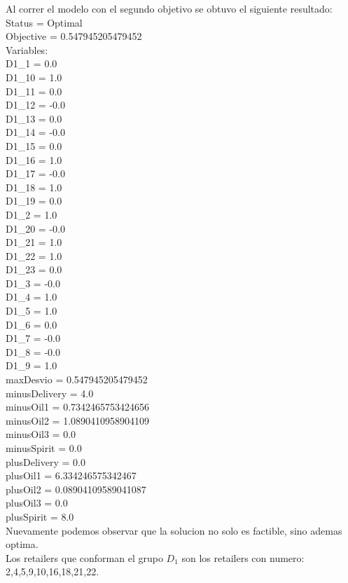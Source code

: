 Al correr el modelo con el segundo objetivo se obtuvo el siguiente resultado: \\

Status = Optimal \\
Objective = 0.547945205479452 \\
Variables: \\
D1\_1 = 0.0 \\
D1\_10 = 1.0 \\
D1\_11 = 0.0 \\
D1\_12 = -0.0 \\
D1\_13 = 0.0 \\
D1\_14 = -0.0 \\
D1\_15 = 0.0 \\
D1\_16 = 1.0 \\
D1\_17 = -0.0 \\
D1\_18 = 1.0 \\
D1\_19 = 0.0 \\
D1\_2 = 1.0 \\
D1\_20 = -0.0 \\
D1\_21 = 1.0 \\
D1\_22 = 1.0 \\
D1\_23 = 0.0 \\
D1\_3 = -0.0 \\
D1\_4 = 1.0 \\
D1\_5 = 1.0 \\
D1\_6 = 0.0 \\
D1\_7 = -0.0 \\
D1\_8 = -0.0 \\
D1\_9 = 1.0 \\
maxDesvio = 0.547945205479452 \\
minusDelivery = 4.0 \\
minusOil1 = 0.7342465753424656 \\
minusOil2 = 1.0890410958904109 \\
minusOil3 = 0.0 \\
minusSpirit = 0.0 \\
plusDelivery = 0.0 \\
plusOil1 = 6.334246575342467 \\
plusOil2 = 0.08904109589041087 \\
plusOil3 = 0.0 \\
plusSpirit = 8.0 \\

Nuevamente podemos observar que la solucion no solo es factible, sino ademas optima.\\
Los retailers que conforman el grupo $D_1$ son los retailers con numero: 2,4,5,9,10,16,18,21,22.
